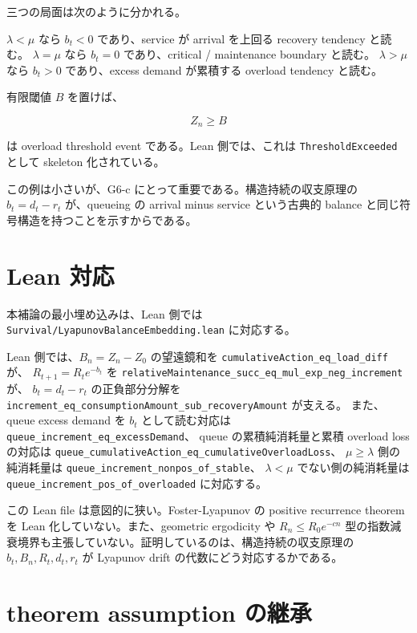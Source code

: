 \documentclass[12pt,a4paper]{article}
\begin{document}
三つの局面は次のように分かれる。

\(\lambda<\mu\) なら \(b_{t}<0\) であり、service が arrival を上回る recovery tendency と読む。 \(\lambda=\mu\) なら \(b_{t}=0\) であり、critical / maintenance boundary と読む。 \(\lambda>\mu\) なら \(b_{t}>0\) であり、excess demand が累積する overload tendency と読む。

有限閾値 \(B\) を置けば、

\[
Z_{n}\ge B
\]

は overload threshold event である。Lean 側では、これは \texttt{ThresholdExceeded} として skeleton 化されている。

この例は小さいが、G6-c にとって重要である。構造持続の収支原理の \(b_{t}=d_{t}-r_{t}\) が、queueing の arrival minus service という古典的 balance と同じ符号構造を持つことを示すからである。

\section{Lean 対応}\label{lean-ux5bfeux5fdc}

本補論の最小埋め込みは、Lean 側では \texttt{Survival/LyapunovBalanceEmbedding.lean} に対応する。

Lean 側では、\(B_{n}=Z_{n}-Z_0\) の望遠鏡和を \texttt{cumulativeAction\_eq\_load\_diff} が、 \(R_{t+1}=R_{t} e^{-b_{t}}\) を \texttt{relativeMaintenance\_succ\_eq\_mul\_exp\_neg\_increment} が、 \(b_{t}=d_{t}-r_{t}\) の正負部分分解を \texttt{increment\_eq\_consumptionAmount\_sub\_recoveryAmount} が支える。 また、queue excess demand を \(b_{t}\) として読む対応は \texttt{queue\_increment\_eq\_excessDemand}、 queue の累積純消耗量と累積 overload loss の対応は \texttt{queue\_cumulativeAction\_eq\_cumulativeOverloadLoss}、 \(\mu\ge\lambda\) 側の純消耗量は \texttt{queue\_increment\_nonpos\_of\_stable}、 \(\lambda<\mu\) でない側の純消耗量は \texttt{queue\_increment\_pos\_of\_overloaded} に対応する。

この Lean file は意図的に狭い。Foster-Lyapunov の positive recurrence theorem を Lean 化していない。また、geometric ergodicity や \(R_{n}\le R_0e^{-cn}\) 型の指数減衰境界も主張していない。証明しているのは、構造持続の収支原理の \(b_{t},B_{n},R_{t},d_{t},r_{t}\) が Lyapunov drift の代数にどう対応するかである。

\section{theorem assumption の継承}\label{theorem-assumption-ux306eux7d99ux627f}
\end{document}
